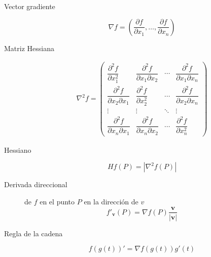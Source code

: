 \begin{multicols}{2}
\begin{tcolorbox}[hbox, title=Derivadas parciales]
\begin{minipage}{0.4\textwidth}
\flushleft
\begin{description}
\item[Vector gradiente]
      \[
      \nabla f = \left(\frac{\partial f}{\partial x_1},\ldots, \frac{\partial f}{\partial x_n}\right)
      \]
\item[Matriz Hessiana]
      \[
      \begin{array}{c}
      \nabla^2f=
      \left(
      \begin{array}{cccc}
      \dfrac{\partial^2 f}{\partial x_1^2}            &
      \dfrac{\partial^2 f}{\partial x_1 \partial x_2} &
      \cdots                                          &
      \dfrac{\partial^2 f}{\partial x_1 \partial x_n}                            \\
      \dfrac{\partial^2 f}{\partial x_2 \partial x_1} &
      \dfrac{\partial^2 f}{\partial x_2^2}            &
      \cdots                                          &
      \dfrac{\partial^2 f}{\partial x_2 \partial x_n}                            \\
      \vdots                                          & \vdots & \ddots & \vdots \\
      \dfrac{\partial^2 f}{\partial x_n \partial x_1} &
      \dfrac{\partial^2 f}{\partial x_n \partial x_2} &
      \cdots                                          &
      \dfrac{\partial^2 f}{\partial x_n^2}
      \end{array}
      \right)
      \end{array}
      \]
\item[Hessiano]
      \[
      Hf(P)=|\nabla^2f(P)|
      \]
\item[Derivada direccional] de $f$ en el punto $P$ en la dirección de $v$
      \[
      f'_{\mathbf{v}}(P) = \nabla f(P)\frac{\mathbf{v}}{|\mathbf{v}|}
      \]
\item[Regla de la cadena]
      \[
      f(g(t))' = \nabla f(g(t))g'(t)
      \]
\end{description}
\end{minipage}
\end{tcolorbox}


\end{multicols}
